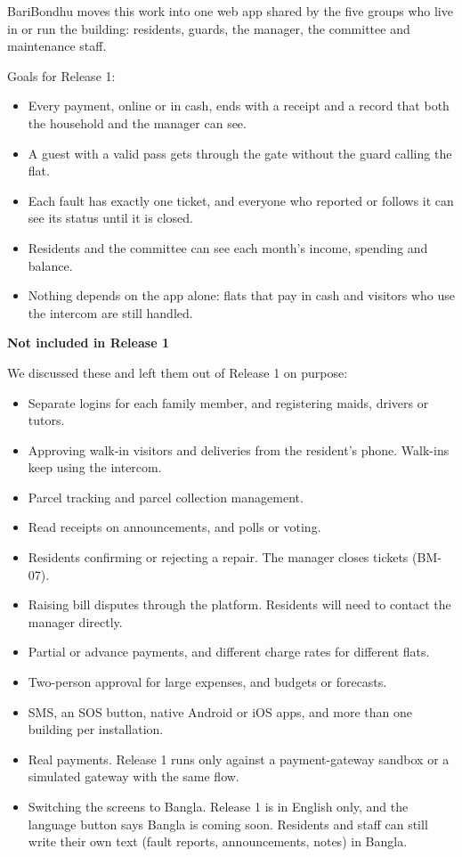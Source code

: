 \documentclass[11pt,a4paper]{report}
\begin{document}
BariBondhu moves this work into one web app shared by the five groups who live in or run the building: residents, guards, the manager, the committee and maintenance staff.

Goals for Release 1:

\begin{itemize}
  \item Every payment, online or in cash, ends with a receipt and a record that both the household and the manager can see.
  \item A guest with a valid pass gets through the gate without the guard calling the flat.
  \item Each fault has exactly one ticket, and everyone who reported or follows it can see its status until it is closed.
  \item Residents and the committee can see each month's income, spending and balance.
  \item Nothing depends on the app alone: flats that pay in cash and visitors who use the intercom are still handled.
\end{itemize}

\medskip\noindent\textbf{Not included in Release 1}\par

We discussed these and left them out of Release 1 on purpose:

\begin{itemize}
  \item Separate logins for each family member, and registering maids, drivers or tutors.
  \item Approving walk-in visitors and deliveries from the resident's phone. Walk-ins keep using the intercom.
  \item Parcel tracking and parcel collection management.
  \item Read receipts on announcements, and polls or voting.
  \item Residents confirming or rejecting a repair. The manager closes tickets (BM-07).
  \item Raising bill disputes through the platform. Residents will need to contact the manager directly.
  \item Partial or advance payments, and different charge rates for different flats.
  \item Two-person approval for large expenses, and budgets or forecasts.
  \item SMS, an SOS button, native Android or iOS apps, and more than one building per installation.
  \item Real payments. Release 1 runs only against a payment-gateway sandbox or a simulated gateway with the same flow.
  \item Switching the screens to Bangla. Release 1 is in English only, and the language button says Bangla is coming soon. Residents and staff can still write their own text (fault reports, announcements, notes) in Bangla.
\end{itemize}
\end{document}
